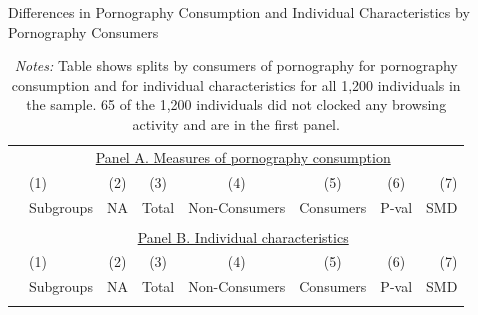 \documentclass[12pt, letterpaper]{article}
\begin{document}
\begin{table}[ht] \centering \small \setlength\tabcolsep{5 pt}
	\caption{Differences in Pornography Consumption and Individual Characteristics by Pornography Consumers}
	\label{tab:characteristics_split_by_porn_consumers}
	\begin{adjustbox}{max width=\textwidth}
		\begin{tabular}{@{\hspace{0\tabcolsep}}llrcccrr@{\hspace{0\tabcolsep}}}
			\toprule
			&\multicolumn{7}{c}{\underline{Panel A. Measures of pornography consumption}}\\
			&\multicolumn{1}{l}{(1)}&\multicolumn{1}{c}{(2)}&\multicolumn{1}{c}{(3)}&\multicolumn{1}{c}{(4)}&\multicolumn{1}{c}{(5)}&\multicolumn{1}{c}{(6)}&\multicolumn{1}{r}{(7)}\\			
			&\multicolumn{1}{l}{Subgroups}&\multicolumn{1}{c}{NA}&\multicolumn{1}{c}{Total}&\multicolumn{1}{c}{Non-Consumers}&\multicolumn{1}{c}{Consumers}&\multicolumn{1}{c}{P-val}&\multicolumn{1}{r}{SMD}\\
			\cmidrule{2-8}
			\\
			\cmidrule{2-8}
			&\multicolumn{7}{c}{\underline{Panel B. Individual characteristics}}\\
			&\multicolumn{1}{l}{(1)}&\multicolumn{1}{c}{(2)}&\multicolumn{1}{c}{(3)}&\multicolumn{1}{c}{(4)}&\multicolumn{1}{c}{(5)}&\multicolumn{1}{c}{(6)}&\multicolumn{1}{r}{(7)}\\			
			&\multicolumn{1}{l}{Subgroups}&\multicolumn{1}{c}{NA}&\multicolumn{1}{c}{Total}&\multicolumn{1}{c}{Non-Consumers}&\multicolumn{1}{c}{Consumers}&\multicolumn{1}{c}{P-val}&\multicolumn{1}{r}{SMD}\\
			\cmidrule{2-8}
			\\
			\bottomrule
		\end{tabular}
	\end{adjustbox}
	\caption*{\scriptsize \emph{Notes:}
		Table shows splits by consumers of pornography for pornography consumption and for individual characteristics for all 1,200 individuals in the sample.
		65 of the 1,200 individuals did not clocked any browsing activity and are in the first panel. 
}
\end{table}
\end{document}
